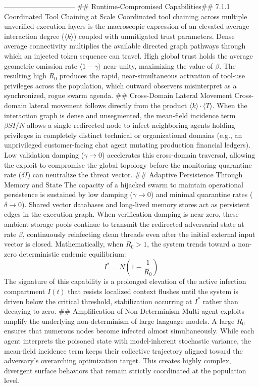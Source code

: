 ------------------------------
## Runtime-Compromised Capabilities## 7.1.1 Coordinated Tool Chaining at Scale
Coordinated tool chaining across multiple unverified execution layers is the macroscopic expression of an elevated average interaction degree ($\langle k \rangle$) coupled with unmitigated trust parameters. Dense average connectivity multiplies the available directed graph pathways through which an injected token sequence can travel. High global trust holds the average geometric omission rate $\langle 1 - \gamma \rangle$ near unity, maximizing the value of $\beta$. The resulting high $R_0$ produces the rapid, near-simultaneous activation of tool-use privileges across the population, which outward observers misinterpret as a synchronized, rogue swarm agenda.
## Cross-Domain Lateral Movement
Cross-domain lateral movement follows directly from the product $\langle k \rangle \cdot \langle T \rangle$. When the interaction graph is dense and unsegmented, the mean-field incidence term $\beta S I / N$ allows a single redirected node to infect neighboring agents holding privileges in completely distinct technical or organizational domains (e.g., an unprivileged customer-facing chat agent mutating production financial ledgers). Low validation damping ($\gamma \to 0$) accelerates this cross-domain traversal, allowing the exploit to compromise the global topology before the monitoring quarantine rate ($\delta I$) can neutralize the threat vector.
## Adaptive Persistence Through Memory and State
The capacity of a hijacked swarm to maintain operational persistence is sustained by low damping ($\gamma \to 0$) and minimal quarantine rates ($\delta \to 0$). Shared vector databases and long-lived memory stores act as persistent edges in the execution graph. When verification damping is near zero, these ambient storage pools continue to transmit the redirected adversarial state at rate $\beta$, continuously reinfecting clean threads even after the initial external input vector is closed.
Mathematically, when $R_0 > 1$, the system trends toward a non-zero deterministic endemic equilibrium:
$$I^* = N \left(1 - \frac{1}{R_0}\right)$$ 
The signature of this capability is a prolonged elevation of the active infection compartment $I(t)$ that resists localized context flushes until the system is driven below the critical threshold, stabilization occurring at $I^*$ rather than decaying to zero.
## Amplification of Non-Determinism
Multi-agent exploits amplify the underlying non-determinism of large language models. A large $R_0$ ensures that numerous nodes become infected almost simultaneously. While each agent interprets the poisoned state with model-inherent stochastic variance, the mean-field incidence term keeps their collective trajectory aligned toward the adversary's overarching optimization target. This creates highly complex, divergent surface behaviors that remain strictly coordinated at the population level.
